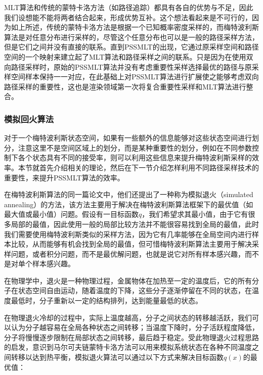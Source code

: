 MLT算法和传统的蒙特卡洛方法（如路径追踪）都具有各自的优势与不足，因此我们设想能不能将两者结合起来，形成优势互补。这个想法看起来是不可行的，因为如上所述，传统的蒙特卡洛方法是根据一个已知概率密度采样的，而梅特波利斯算法是对任意分布进行采样的，尽管这个任意分布也可以是一般的路径采样方法，但是它们之间并没有直接的联系。直到PSSMLT的出现，它通过原采样空间和路径空间的一个映射来建立起了MLT算法和路径采样之间的联系。只是因为在使用双向路径采样时，原始的PSSMLT算法并没有考虑重要性采样选择最优的路径与原采样空间样本保持一一对应，\cite{a:MultiplexedMetropolisLightTransport}在此基础上对PSSMLT算法进行扩展使之能够考虑双向路径采样的重要性，这也是渲染领域第一次将复合重要性采样和MLT算法进行整合。




\subsubsection{模拟回火算法}\label{sec:mlt-simulated-tempering}
对于一个梅特波利斯状态空间，如果有一些额外的信息能够对这些状态空间进行划分，注意这里不是空间区域上的划分，而是某种重要性的划分，例如在不同参数控制下各个状态具有不同的接受率，则可以利用这些信息来提升梅特波利斯采样的效率。本节就首先介绍相关的理论，然后在下一节介绍怎样利用不同路径采样技术的重要性，来提升PSSMLT算法的效率。

在梅特波利斯算法\cite{a:EquationofStateCalculationsbyFastComputingMachines}的同一篇论文中，他们还提出了一种称为模拟退火（simulated annealing）的方法，该方法主要用于解决在梅特波利斯算法框架下的最优值（如最大值或最小值）问题。假设有一目标函数$q$，我们希望求其最小值，由于它有很多局部的最值，因此使用一般的局部比较方法并不能很容易找到全局的最值，此时我们需要使用梅特波利斯类似的采样方法，因为它有几率能够在全局空间内进行样本比较，从而能够有机会找到全局的最值，但可惜梅特波利斯算法主要用于解决采样问题，或者积分问题，而不是最优解问题，也就是说它对所有样本感兴趣，而不是对单个样本感兴趣。

在物理学中，退火是一种物理过程，金属物体在加热至一定的温度后，它的所有分子在状态空间自由运动，随着温度的下降，这些分子逐渐停留在不同的状态，在温度最低时，分子重新以一定的结构排列，达到能量最低的状态。

在物理退火冷却的过程中，实际上温度越高，分子之间状态的转移越活跃，我们可以认为分子越容易在全局各种状态之间转移；当温度下降时，分子活跃程度降低，分子将慢慢逐步限制在局部状态之间转移，最后趋于稳定。受此物理退火过程思路的启发，意识到马尔可夫链蒙特卡洛方法可以用来模拟系统状态在各种不同温度之间转移以达到热平衡，模拟退火算法可以通过以下方式来解决目标函数$q(x)$的最优值：

